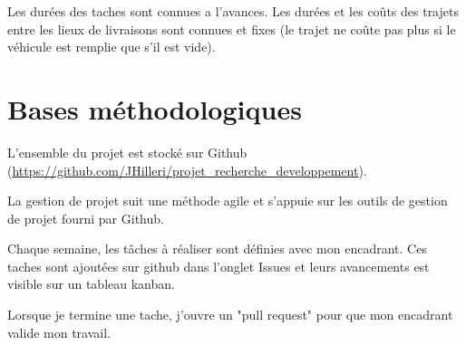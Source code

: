 Les durées des taches sont connues a l'avances.
Les durées et les coûts des trajets entre les lieux de livraisons sont connues et fixes (le trajet ne coûte pas plus si le véhicule est remplie que s'il est vide).


\section{Bases méthodologiques}
L'ensemble du projet est stocké sur Github (\url{https://github.com/JHilleri/projet_recherche_developpement}).

La gestion de projet suit une méthode agile et s'appuie sur les outils de gestion de projet fourni par Github.

Chaque semaine, les tâches à réaliser sont définies avec mon encadrant.
Ces taches sont ajoutées sur github dans l'onglet Issues et leurs avancements est visible sur un tableau kanban.

Lorsque je termine une tache, j'ouvre un "pull request" pour que mon encadrant valide mon travail.
